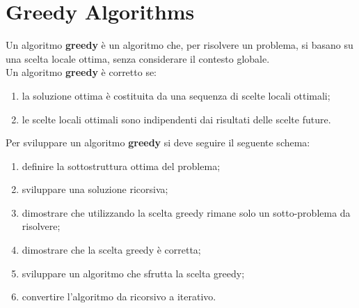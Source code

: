 \documentclass{article}
\begin{document}
\section{Greedy Algorithms}
Un algoritmo \textbf{greedy} è un algoritmo che, per risolvere un problema, si
basano su una scelta locale ottima, senza considerare il contesto globale.\\
Un algoritmo \textbf{greedy} è corretto se:
\begin{enumerate}
	\item la soluzione ottima è costituita da una sequenza di scelte locali
	      ottimali;
	\item le scelte locali ottimali sono indipendenti dai risultati delle scelte
	      future.
\end{enumerate}

Per sviluppare un algoritmo \textbf{greedy} si deve seguire il seguente schema:
\begin{enumerate}
	\item definire la sottostruttura ottima del problema;
	\item sviluppare una soluzione ricorsiva;
	\item dimostrare che utilizzando la scelta greedy rimane solo un sotto-problema da risolvere;
	\item dimostrare che la scelta greedy è corretta;
	\item sviluppare un algoritmo che sfrutta la scelta greedy;
	\item convertire l'algoritmo da ricorsivo a iterativo.
\end{enumerate}
\end{document}
